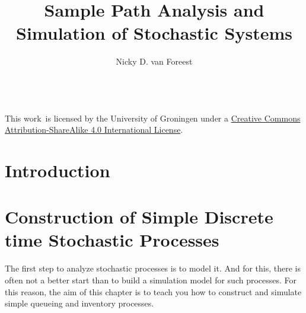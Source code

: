 \title{Sample Path Analysis  and Simulation  of Stochastic Systems}
\author{Nicky D. van  Foreest}


\frontmatter
\maketitle

\noindent
\href{https://creativecommons.org/licenses/by-sa/4.0/}{\ccbysa} \\
This work\ is licensed by the University of Groningen under a
\href{https://creativecommons.org/licenses/by-sa/4.0/}{Creative Commons Attribution-ShareAlike 4.0 International License}.

\tableofcontents

\newpage

\tableofcontents





\mainmatter

\chapter{Introduction}
\label{cha:introduction}







\chapter{Construction of Simple Discrete time Stochastic Processes}
\label{cha:single-stat-queu}


The first step to analyze stochastic processes is to model it.
And for this, there is often not a better start than to build a simulation model for such processes.
For this reason, the aim of  this chapter is to teach you how to construct  and simulate simple queueing and inventory processes.

